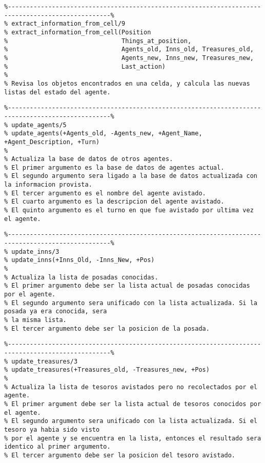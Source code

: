 \documentclass[a4paper,12pt]{report}
\begin{document}
\begin{scriptsize}
\begin{verbatim}
%--------------------------------------------------------------------------------------------------%
% extract_information_from_cell/9
% extract_information_from_cell(Position
%                               Things_at_position,
%                               Agents_old, Inns_old, Treasures_old,
%                               Agents_new, Inns_new, Treasures_new,
%                               Last_action)
%
% Revisa los objetos encontrados en una celda, y calcula las nuevas listas del estado del agente.
\end{verbatim}
\end{scriptsize}

\begin{scriptsize}
\begin{verbatim}
%--------------------------------------------------------------------------------------------------%
% update_agents/5
% update_agents(+Agents_old, -Agents_new, +Agent_Name, +Agent_Description, +Turn)
%
% Actualiza la base de datos de otros agentes. 
% El primer argumento es la base de datos de agentes actual.
% El segundo argumento sera ligado a la base de datos actualizada con la informacion provista.
% El tercer argumento es el nombre del agente avistado.
% El cuarto argumento es la descripcion del agente avistado.
% El quinto argumento es el turno en que fue avistado por ultima vez el agente.
\end{verbatim}
\end{scriptsize}

\begin{scriptsize}
\begin{verbatim}
%--------------------------------------------------------------------------------------------------%
% update_inns/3
% update_inns(+Inns_Old, -Inns_New, +Pos)
%
% Actualiza la lista de posadas conocidas. 
% El primer argumento debe ser la lista actual de posadas conocidas por el agente. 
% El segundo argumento sera unificado con la lista actualizada. Si la posada ya era conocida, sera
% la misma lista. 
% El tercer argumento debe ser la posicion de la posada.
\end{verbatim}
\end{scriptsize}

\begin{scriptsize}
\begin{verbatim}
%--------------------------------------------------------------------------------------------------%
% update_treasures/3
% update_treasures(+Treasures_old, -Treasures_new, +Pos)
% 
% Actualiza la lista de tesoros avistados pero no recolectados por el agente. 
% El primer argument debe ser la lista actual de tesoros conocidos por el agente. 
% El segundo argumento sera unificado con la lista actualizada. Si el tesoro ya habia sido visto
% por el agente y se encuentra en la lista, entonces el resultado sera identico al primer argumento.
% El tercer argumento debe ser la posicion del tesoro avistado.
\end{verbatim}
\end{scriptsize}
\end{document}

